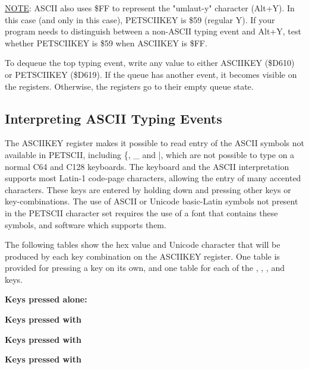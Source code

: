 \underline{NOTE}: ASCII also uses \$FF to represent the "umlaut-y" character (Alt+Y). In this case (and only in this case), PETSCIIKEY is \$59 (regular Y). If your program needs to distinguish between a non-ASCII typing event and Alt+Y, test whether PETSCIIKEY is \$59 when ASCIIKEY is \$FF.

To dequeue the top typing event, write any value to either ASCIIKEY (\$D610) or PETSCIIKEY (\$D619). If the queue has another event, it becomes visible on the registers. Otherwise, the registers go to their empty queue state.

\subsection{Interpreting ASCII Typing Events}

The ASCIIKEY register makes it possible to read entry of the ASCII symbols not available in PETSCII, including \{, \_ and |, which are not possible to type on a normal C64 and C128 keyboards. The keyboard and the ASCII interpretation supports most Latin-1 code-page characters, allowing the entry of many accented characters. These keys are entered by holding down \megasymbolkey and pressing other keys or key-combinations. The use of ASCII or Unicode basic-Latin symbols not present in the PETSCII character set requires the use of a font that contains these symbols, and software which supports them.

The following tables show the hex value and Unicode character that will be produced by each key combination on the ASCIIKEY register. One table is provided for pressing a key on its own, and one table for each of the , , \megasymbolkey, and  keys.

\begin{minipage}{\textwidth}
\bf{Keys pressed alone:}

\end{minipage}

\begin{minipage}{\textwidth}
\bf{Keys pressed with }

\end{minipage}

\begin{minipage}{\textwidth}
\bf{Keys pressed with }

\end{minipage}

\begin{minipage}{\textwidth}
\bf{Keys pressed with \megasymbolkey}

\end{minipage}

